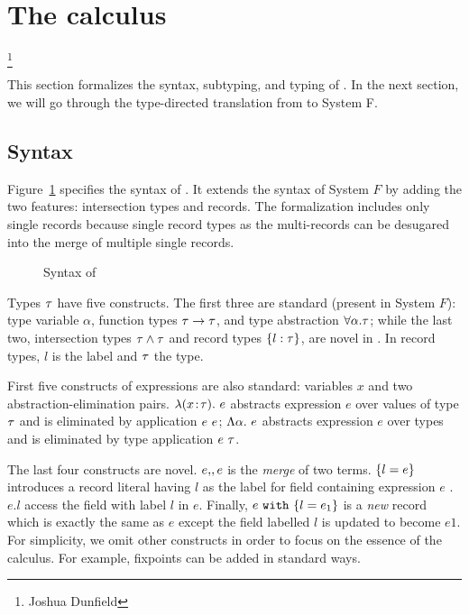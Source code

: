 \section{The \name calculus}

\footnote{Joshua Dunfield}

This section formalizes the syntax, subtyping, and typing of \name. In the next
section, we will go through the type-directed translation from \name to System
F.


\subsection{Syntax}

Figure~\ref{fig:fi-syntax} specifies the syntax of \Name. It extends the syntax
of System $ F $ by adding the two features: intersection types and records. The
formalization includes only single records because single record types as the
multi-records can be desugared into the merge of multiple single records.

\begin{figure}
  
  \caption{Syntax of \name}
  \label{fig:fi-syntax}
\end{figure}

Types $ \tau $ have five constructs. The first three are standard (present in
System $ F $): type variable $ \alpha $, function types $ \tau \to \tau $, and type
abstraction $ \forall \alpha. \tau $; while the last two, intersection types
$ \tau \wedge \tau $ and record types $ \{ l : \tau \} $, are novel in \Name. In
record types, $ l $ is the label and $ \tau $ the type.

First five constructs of expressions are also standard: variables $ x $ and two
abstraction-elimination pairs. $ \lambda (x \!:\! \tau).~ e $ abstracts expression
$ e $ over values of type $ \tau $ and is eliminated by application $ {e} ~ {e} $;
$ \Lambda \alpha.~ e $ abstracts expression $ e $ over types and is eliminated by
type application $ {e} ~ {\tau} $.

The last four constructs are novel. $ e ,\!, e $ is the \emph{merge} of two
terms. $ \{ l = e \} $ introduces a record literal having $ l $ as the
label for field containing expression $ e $ . $ e.l $ access the field with
label $ l $ in $ e $. Finally, $ e ~ \texttt{with} ~ \{ l = e_1 \} $ is a \emph{new}
record which is exactly the same as $ e $ except the field labelled $ l $ is
updated to become $ e1 $. For simplicity, we omit other constructs in order to
focus on the essence of the calculus. For example, fixpoints can be added in
standard ways.


